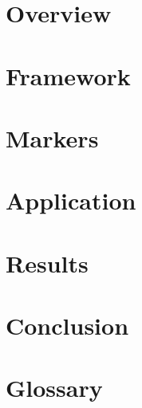 \documentclass{thesis}
\begin{document}
\frontmatter
\maketitle
\clearpage
\impressum

\cleardoublepage
{}


\cleardoublepage


\tableofcontents

\mainmatter
\chapter{Overview}

\chapter{Framework}

\chapter{Markers}

\chapter{Application}

\chapter{Results}

\chapter{Conclusion}

\chapter*{Glossary}


\appendix
%

\backmatter

\listoffigures


{\small

}

\clearpage
\erklaerung
\end{document}
